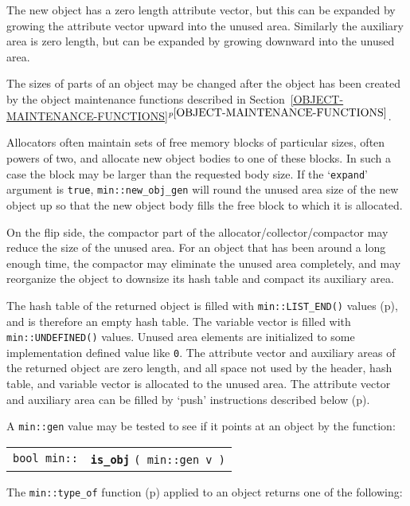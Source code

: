 \documentclass[12pt]{article}
\makeatletter
\newcommand{\ttindex}[1]{\index{#1@{\tt #1}}}
\newcommand{\minindex}[1]{\ttindex{min::#1}\ttindex{#1}}
\newcommand{\itemref}[1]{\ref{#1}$^{p\pageref{#1}}$}
\newcommand{\pagref}[1]{p\pageref{#1}}
\newcommand{\EOL}{\penalty \exhyphenpenalty}
\newenvironment{indpar}[1][0.3in]%
	{\begin{list}{}%
		     {\setlength{\itemsep}{0in}%
		      \setlength{\topsep}{0in}%
		      \setlength{\parsep}{1ex}%
		      \setlength{\labelwidth}{#1}%
		      \setlength{\leftmargin}{#1}%
		      \addtolength{\leftmargin}{\labelsep}}%
	 \item}%
	{\end{list}}
\newcommand{\LABEL}[1]{\label{#1}}
\newcommand{\MINKEY}[1]{{\tt \bf #1}\minindex{#1}}
\makeatother
\begin{document}
The new object has a zero length attribute vector, but this can be
expanded by growing the attribute vector upward into the unused area.
Similarly the auxiliary area is zero length, but can be expanded by
growing downward into the unused area.

The sizes of parts of an object may be changed after the object has
been created by the object maintenance functions
described in Section~\itemref{OBJECT-MAINTENANCE-FUNCTIONS}.

Allocators often maintain sets of free memory blocks of particular
sizes, often powers of two, and allocate new object bodies to one
of these blocks.  In such a case the block may be larger than the
requested body size.  If the `{\tt expand}' argument is {\tt true},
{\tt min::\EOL new\_\EOL obj\_\EOL gen} will round the unused area
size of the new object up so that the new object body fills the
free block to which it is allocated.

On the flip side, the compactor part of the
allocator/\EOL collector/\EOL compactor
may reduce the size of the unused
area.  For an object that has been around a long enough time, the
compactor may eliminate the unused area completely, and may reorganize
the object to downsize its hash table and compact its auxiliary area.

The hash table of the returned object is filled with \verb|min::LIST_END()|
values (\pagref{MIN::LIST_END}), and is therefore an empty hash table.
The variable vector is filled with \verb|min::UNDEFINED()| values.
Unused area elements are initialized to some implementation defined
value like \verb|0|.
The attribute vector and auxiliary areas of the returned object are
zero length, and all space not used by the header, hash table, and
variable vector is allocated to the unused area.
The attribute vector and auxiliary area can be
filled by `push' instructions described below
(\pagref{OBJECT_PUSH_FUNCTIONS}).

A \verb|min::gen| value may be tested to see if it points at an
object by the function:

\begin{indpar}\begin{tabular}{r@{}l}
\verb|bool min::| & \MINKEY{is\_obj} \verb|( min::gen v )|
\LABEL{MIN::IS_OBJ} \\
\end{tabular}\end{indpar}

The {\tt min::type\_of} function (\pagref{MIN::TYPE_OF_GEN})
applied to an object returns one of the following:
\end{document}
